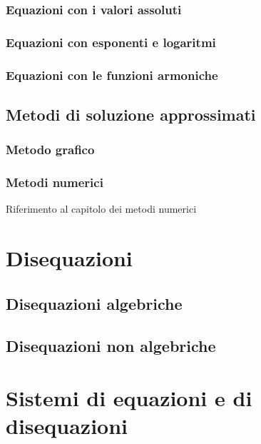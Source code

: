 \subsection{Equazioni con i valori assoluti}
\subsection{Equazioni con esponenti e logaritmi}
\subsection{Equazioni con le funzioni armoniche}

\section{Metodi di soluzione approssimati}
\subsection{Metodo grafico}
\subsection{Metodi numerici}
{\color{red} Riferimento al capitolo dei metodi numerici}

\chapter{Disequazioni}
\section{Disequazioni algebriche}
\section{Disequazioni non algebriche}

\chapter{Sistemi di equazioni e di disequazioni}



